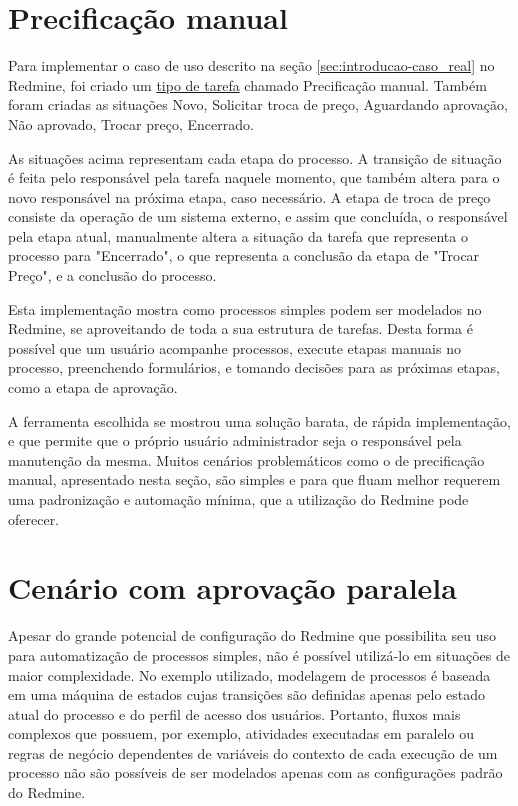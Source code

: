 \section{Precificação manual}\label{sec:redmine-impl-caso-uso}

Para implementar o caso de uso descrito na seção \ref{sec:introducao-caso_real} no Redmine, foi criado um \underline{tipo de tarefa} chamado Precificação manual. Também foram criadas as situações Novo, Solicitar troca de preço, Aguardando aprovação, Não aprovado, Trocar preço, Encerrado.

As situações acima representam cada etapa do processo. A transição de situação é feita pelo responsável pela tarefa naquele momento, que também altera para o novo responsável na próxima etapa, caso necessário. A etapa de troca de preço consiste da operação de um sistema externo, e assim que concluída, o responsável pela etapa atual, manualmente altera a situação da tarefa que representa o processo para "Encerrado", o que representa a conclusão da etapa de "Trocar Preço", e a conclusão do processo.

Esta implementação mostra como processos simples podem ser modelados no Redmine, se aproveitando de toda a sua estrutura de tarefas. Desta forma é possível que um usuário acompanhe processos, execute etapas manuais no processo, preenchendo formulários, e tomando decisões para as próximas etapas, como a etapa de aprovação.

A ferramenta escolhida se mostrou uma solução barata, de rápida implementação, e que permite que o próprio usuário administrador seja o responsável pela manutenção da mesma. 
Muitos cenários problemáticos como o de precificação manual, apresentado nesta seção, são simples e para que fluam melhor requerem uma padronização e automação mínima, que a utilização do Redmine pode oferecer.

\section{Cenário com aprovação paralela}\label{sec:cenario-complexo}

Apesar do grande potencial de configuração do Redmine que possibilita seu uso para automatização de processos simples, não é possível utilizá-lo em situações de maior complexidade. No exemplo utilizado, modelagem de processos é baseada em uma máquina de estados cujas transições são definidas apenas pelo estado atual do processo e do perfil de acesso dos usuários. Portanto, fluxos mais complexos que possuem, por exemplo, atividades executadas em paralelo ou regras de negócio dependentes de variáveis do contexto de cada execução de um processo não são possíveis de ser modelados apenas com as configurações padrão do Redmine.

